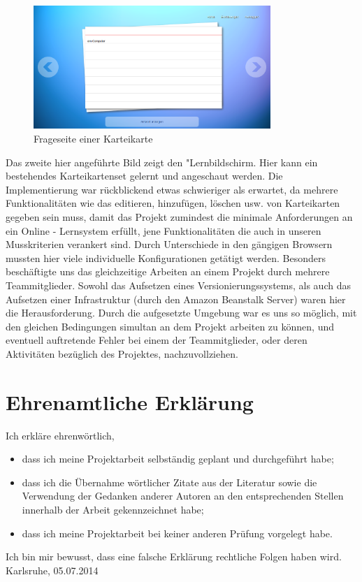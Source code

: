 \documentclass{article}
\begin{document}
\begin{figure}[H]
    \centering
    \includegraphics[width=0.8\textwidth]{images/learningscreen-answer.png}
    \caption{Frageseite einer Karteikarte}
    \label{fig:learning-question}
\end{figure}Das zweite hier angeführte Bild zeigt den "Lernbildschirm. Hier kann ein bestehendes Karteikartenset gelernt und angeschaut werden. Die Implementierung war rückblickend etwas schwieriger als erwartet, da mehrere Funktionalitäten wie das editieren, hinzufügen, löschen usw. von Karteikarten gegeben sein muss, damit das Projekt zumindest die minimale Anforderungen an ein Online - Lernsystem erfüllt, jene Funktionalitäten die auch in unseren Musskriterien verankert sind. Durch Unterschiede in den gängigen Browsern mussten hier viele individuelle Konfigurationen getätigt werden. 
Besonders beschäftigte uns das gleichzeitige Arbeiten an einem Projekt durch mehrere Teammitglieder. Sowohl das Aufsetzen eines Versionierungssystems, als auch das Aufsetzen einer Infrastruktur (durch den Amazon Beanstalk Server) waren hier die Herausforderung. Durch die aufgesetzte Umgebung war es uns so möglich, mit den gleichen Bedingungen simultan an dem Projekt arbeiten zu können, und eventuell auftretende Fehler bei einem der Teammitglieder, oder deren Aktivitäten bezüglich des Projektes, nachzuvollziehen.

\section{Ehrenamtliche Erklärung}

Ich erkläre ehrenwörtlich,
\begin{itemize}
    \item dass ich meine Projektarbeit selbständig geplant und durchgeführt habe;
    \item dass ich die Übernahme wörtlicher Zitate aus der Literatur sowie die Verwendung der Gedanken anderer Autoren an den entsprechenden Stellen innerhalb der Arbeit gekennzeichnet habe;
    \item dass ich meine Projektarbeit bei keiner anderen Prüfung
    vorgelegt habe.
\end{itemize}
Ich bin mir bewusst, dass eine falsche Erklärung rechtliche Folgen haben wird. \\

\vspace{1cm}
Karlsruhe, 05.07.2014 
\end{document}
